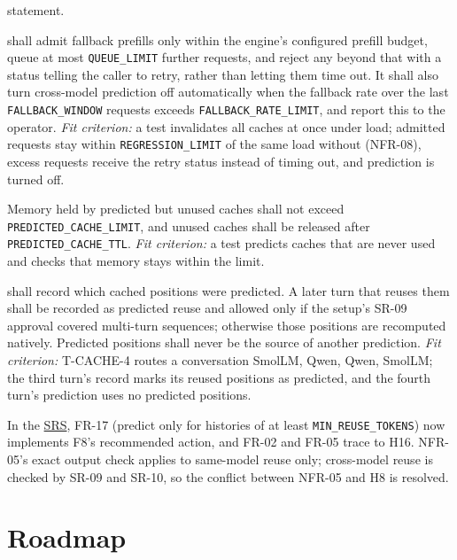 \documentclass{article}
\newcommand{\srs}{\href{https://tandemkv.github.io/Tandem/SRS-Volere/SRS.pdf}{SRS}}
\begin{document}
\begin{description}[style=nextline]
  statement.
  \item[SR-13 --- Limit fallback load (H14)] \progname{} shall admit
  fallback prefills only within the engine's configured prefill budget,
  queue at most \texttt{QUEUE\_LIMIT} further requests, and reject any
  beyond that with a status telling the caller to retry, rather than
  letting them time out. It shall also turn cross-model prediction off
  automatically when the fallback rate over the last
  \texttt{FALLBACK\_WINDOW} requests exceeds \texttt{FALLBACK\_RATE\_LIMIT},
  and report this to the operator.
  \emph{Fit criterion:} a test invalidates all caches at once under load;
  admitted requests stay within \texttt{REGRESSION\_LIMIT} of the same load
  without \progname{} (NFR-08), excess requests receive the retry status
  instead of timing out, and prediction is turned off.
  \item[SR-14 --- Bound memory for predicted caches (H12)] Memory held by
  predicted but unused caches shall not exceed
  \texttt{PREDICTED\_CACHE\_LIMIT}, and unused caches shall be released after
  \texttt{PREDICTED\_CACHE\_TTL}. \emph{Fit criterion:} a test predicts
  caches that are never used and checks that memory stays within the limit.
  \item[SR-15 --- Keep predicted positions marked on later turns (H17)]
  \progname{} shall record which cached positions were predicted. A later
  turn that reuses them shall be recorded as predicted reuse and allowed only
  if the setup's SR-09 approval covered multi-turn sequences; otherwise those
  positions are recomputed natively. Predicted positions shall never be the
  source of another prediction. \emph{Fit criterion:} T-CACHE-4 routes a
  conversation SmolLM, Qwen, Qwen, SmolLM; the third turn's record marks its
  reused positions as predicted, and the fourth turn's prediction uses no
  predicted positions.
\end{description}

In the \srs{}, FR-17 (predict only for histories of at least
\texttt{MIN\_REUSE\_TOKENS}) now implements F8's recommended action, and
FR-02 and FR-05 trace to H16. NFR-05's exact output check applies to
same-model reuse only; cross-model reuse is checked by SR-09 and SR-10, so the
conflict between NFR-05 and H8 is resolved.

\section{Roadmap}
\label{sec:roadmap}
\end{document}

